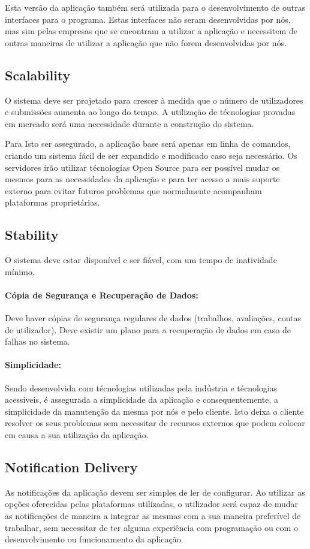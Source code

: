\documentclass[10pt]{article}
\begin{document}
Esta versão da aplicação também será utilizada para o desenvolvimento de outras interfaces para o programa. Estas
interfaces não seram desenvolvidas por nós, mas sim pelas empresas que se encontram a utilizar a aplicação e
necessitem de outras maneiras de utilizar a aplicação que não forem desenvolvidas por nós.

\subsection{Scalability}
O sistema deve ser projetado para crescer à medida que o número de utilizadores e submissões aumenta ao longo do tempo.
A utilização de técnologias provadas em mercado será uma necessidade durante a construção do sistema.

Para Isto ser assegurado, a aplicação base será apenas em linha de comandos, criando um sistema fácil de
ser expandido e modificado caso seja necessário. Os servidores irão utilizar técnologias Open Source
para ser possível mudar os mesmos para as necessidades da aplicação e para ter acesso a mais suporte
externo para evitar futuros problemas que normalmente acompanham plataformas proprietárias.

\subsection{Stability}
O sistema deve estar disponível e ser fiável, com um tempo de inatividade mínimo.

\paragraph{Cópia de Segurança e Recuperação de Dados:\\}
Deve haver cópias de segurança regulares de dados (trabalhos, avaliações, contas de utilizador).
Deve existir um plano para a recuperação de dados em caso de falhas no sistema.

\paragraph{Simplicidade:\\}
Sendo desenvolvida com técnologias utilizadas pela indústria e técnologias acessiveis, é assegurada
a simplicidade da aplicação e consequentemente, a simplicidade da manutenção da mesma por nós e pelo
cliente. Isto deixa o cliente resolver os seus problemas sem necessitar de recursos externos que podem
colocar em causa a sua utilização da aplicação.

\subsection{Notification Delivery}
As notificações da aplicação devem ser simples de ler de configurar. Ao utilizar as opções oferecidas pelas
plataformas utilizadas, o utilizador será capaz de mudar as notificações de maneira a integrar as mesmas
com a sua maneira preferível de trabalhar, sem necessitar de ter alguma experiência com programação ou com
o desenvolvimento ou funcionamento da aplicação.
\end{document}

